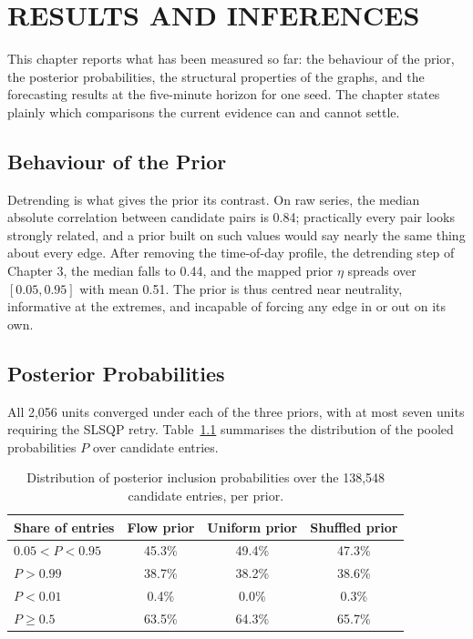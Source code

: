 \documentclass[MTech]{ugthesis}
\begin{document}
\newcommand{\partTwoStartPage}{28}

\setcounter{chapter}{3}
\setcounter{page}{\partTwoStartPage}
\chapter{RESULTS AND INFERENCES}
\label{chap:results}

This chapter reports what has been measured so far: the behaviour of the prior, the posterior probabilities, the structural properties of the graphs, and the forecasting results at the five-minute horizon for one seed. The chapter states plainly which comparisons the current evidence can and cannot settle.

\section{Behaviour of the Prior}
Detrending is what gives the prior its contrast. On raw series, the median absolute correlation between candidate pairs is 0.84; practically every pair looks strongly related, and a prior built on such values would say nearly the same thing about every edge. After removing the time-of-day profile, the detrending step of Chapter 3, the median falls to 0.44, and the mapped prior $\eta$ spreads over $[0.05, 0.95]$ with mean 0.51. The prior is thus centred near neutrality, informative at the extremes, and incapable of forcing any edge in or out on its own.

\section{Posterior Probabilities}
All 2,056 units converged under each of the three priors, with at most seven units requiring the SLSQP retry. Table~\ref{tab:pstats} summarises the distribution of the pooled probabilities $P$ over candidate entries.

\begin{table}[htpb]
\small
\renewcommand{\arraystretch}{1.4}
\centering
\caption{Distribution of posterior inclusion probabilities over the 138,548 candidate entries, per prior.}
\label{tab:pstats}
\begin{tabular}{|p{4.2cm}|c|c|c|}
\hline
Share of entries & Flow prior & Uniform prior & Shuffled prior \\ \hline
$0.05 < P < 0.95$ & 45.3\% & 49.4\% & 47.3\% \\ \hline
$P > 0.99$ & 38.7\% & 38.2\% & 38.6\% \\ \hline
$P < 0.01$ & 0.4\% & 0.0\% & 0.3\% \\ \hline
$P \ge 0.5$ & 63.5\% & 64.3\% & 65.7\% \\ \hline
\end{tabular}
\end{table}
\end{document}
